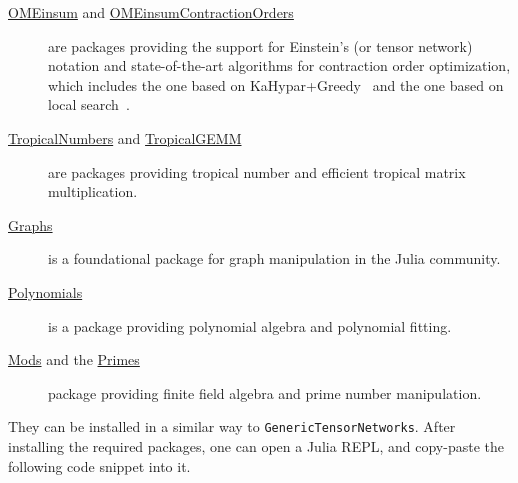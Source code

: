 \documentclass[review,supplement,onefignum,onetabnum]{siamart190516}
\begin{document}
\begin{description}
	\item[\href{https://github.com/under-Peter/OMEinsum.jl}{OMEinsum} and \href{https://github.com/TensorBFS/OMEinsumContractionOrders.jl}{OMEinsumContractionOrders}] are packages providing the support for Einstein's (or tensor network) notation and state-of-the-art algorithms for contraction order optimization, which includes the one based on KaHypar+Greedy~\cite{Gray2021, Pan2021} and the one based on local search~\cite{Kalachev2021}.
	\item[\href{https://github.com/TensorBFS/TropicalNumbers.jl}{TropicalNumbers} and \href{https://github.com/TensorBFS/TropicalGEMM.jl}{TropicalGEMM}] are packages providing tropical number and efficient tropical matrix multiplication.
	\item[\href{https://github.com/JuliaGraphs/Graphs.jl}{Graphs}] is a foundational package for graph manipulation in the Julia community.
	\item[\href{https://github.com/JuliaMath/Polynomials.jl}{Polynomials}] is a package providing polynomial algebra and polynomial fitting.
	\item[\href{https://github.com/scheinerman/Mods.jl}{Mods} and the \href{https://github.com/JuliaMath/Primes.jl}{Primes}] package providing finite field algebra and prime number manipulation.
\end{description}

They can be installed in a similar way to \texttt{GenericTensorNetworks}.
After installing the required packages, one can open a Julia REPL, and copy-paste the following code snippet into it.





\end{document}
